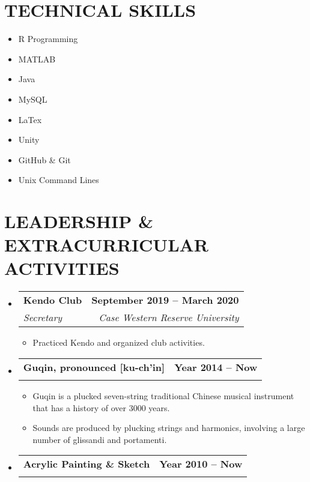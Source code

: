 \documentclass[letterpaper,11pt]{article}
\makeatletter
\newcommand{\resumeItem}[1]{
	\item\small{
		{#1 \vspace{0pt}}
	}
}
\newcommand{\resumeSubheading}[4]{
	\vspace{-2pt}\item
	\begin{tabular*}{1.0\textwidth}[t]{l@{\extracolsep{\fill}}r}
		\textbf{#1} & \textbf{\small #2} \\
		\textit{\small#3} & \textit{\small #4} \\
	\end{tabular*}\vspace{-4pt}
}
\newcommand{\resumeSubHeadingListStart}{\begin{itemize}[leftmargin=0.0in, label={}]}
\newcommand{\resumeSubHeadingListEnd}{\end{itemize}}
\newcommand{\resumeItemListStart}{\begin{itemize}}
\newcommand{\resumeItemListEnd}{\end{itemize}\vspace{-5pt}}
\makeatother
\begin{document}
	\section{TECHNICAL SKILLS}
	\begin{multicols}{4}
		\begin{itemize}[itemsep=-2pt, parsep=5pt]
			\item\small R Programming
			\item       MATLAB 
			\item       Java
			\item       MySQL
			\item       LaTex
			\item       Unity
			\item       GitHub \& Git 
			\item       Unix Command Lines
			
		\end{itemize}
	\end{multicols}
	\vspace*{2.0\multicolsep}
	\vspace{7pt}
	
	\section{LEADERSHIP \& EXTRACURRICULAR ACTIVITIES}
	\resumeSubHeadingListStart
	\resumeSubheading{Kendo Club}{September 2019 -- March 2020}{Secretary}{Case Western Reserve University}
	\resumeItemListStart
	\resumeItem{Practiced Kendo and organized club activities.}
	\resumeItemListEnd 
	\vspace{-5px}
	
	\resumeSubheading{Guqin, pronounced [ku-ch'in]}{Year 2014 -- Now}{}{} \vspace{-20px}
	\resumeItemListStart
	\resumeItem{Guqin is a plucked seven-string traditional Chinese musical instrument that has a history of over 3000 years.}
	\resumeItem{Sounds are produced by plucking strings and harmonics, involving a large number of glissandi and portamenti.}
	\resumeItemListEnd
	\vspace{-5px}
	
	\resumeSubheading{Acrylic Painting \& Sketch}{Year 2010 -- Now}{}{} \vspace{-20px}
	
	\resumeSubHeadingListEnd
	
\end{document}
